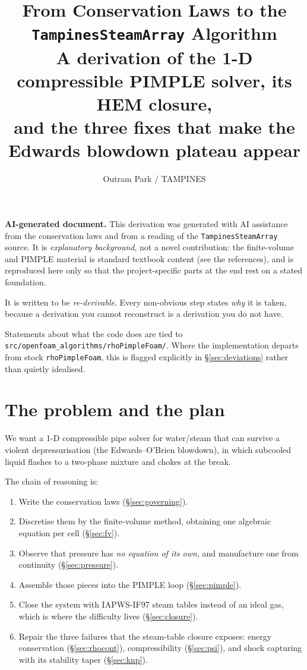 \documentclass[11pt,a4paper]{article}
\title{From Conservation Laws to the \texttt{TampinesSteamArray} Algorithm\\
\large A derivation of the 1-D compressible PIMPLE solver, its HEM closure,\\
and the three fixes that make the Edwards blowdown plateau appear}
\author{Outram Park / TAMPINES}
\date{}
\begin{document}
\maketitle

\begin{framed}
\noindent\textbf{AI-generated document.} This derivation was generated with AI
assistance from the conservation laws and from a reading of the
\texttt{TampinesSteamArray} source. It is \emph{explanatory background}, not a
novel contribution: the finite-volume and PIMPLE material is standard textbook
content (see the references), and is reproduced here only so that the
project-specific parts at the end rest on a stated foundation.

\noindent It is written to be \emph{re-derivable}. Every non-obvious step states
\emph{why} it is taken, because a derivation you cannot reconstruct is a
derivation you do not have.

\noindent Statements about what the code does are tied to
\texttt{src/openfoam\_algorithms/rhoPimpleFoam/}. Where the implementation
departs from stock \texttt{rhoPimpleFoam}, this is flagged explicitly in
\S\ref{sec:deviations} rather than quietly idealised.
\end{framed}

\tableofcontents

\section{The problem and the plan}

We want a 1-D compressible pipe solver for water/steam that can survive a
violent depressurisation (the Edwards--O'Brien blowdown), in which subcooled
liquid flashes to a two-phase mixture and chokes at the break.

The chain of reasoning is:

\begin{enumerate}[leftmargin=*]
  \item Write the conservation laws (\S\ref{sec:governing}).
  \item Discretise them by the finite-volume method, obtaining one algebraic
        equation per cell (\S\ref{sec:fv}).
  \item Observe that pressure has \emph{no equation of its own}, and manufacture
        one from continuity (\S\ref{sec:pressure}).
  \item Assemble those pieces into the PIMPLE loop (\S\ref{sec:pimple}).
  \item Close the system with IAPWS-IF97 steam tables instead of an ideal gas,
        which is where the difficulty lives (\S\ref{sec:closure}).
  \item Repair the three failures that the steam-table closure exposes:
        energy conservation (\S\ref{sec:rhocont}), compressibility
        (\S\ref{sec:psi}), and shock capturing with its stability taper
        (\S\ref{sec:knp}).
\end{enumerate}
\end{document}
